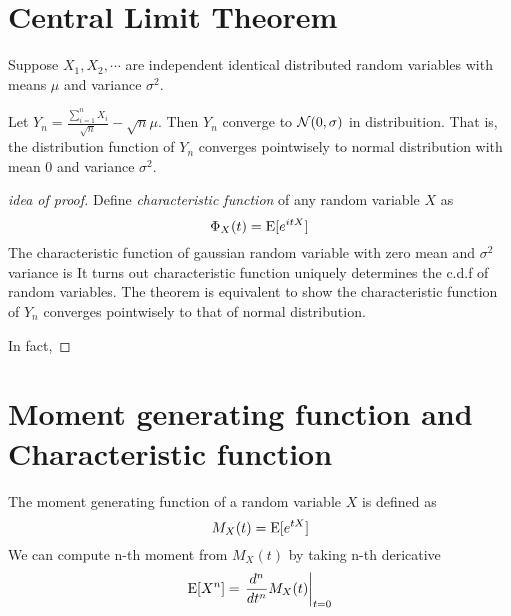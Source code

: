 \section{Central Limit Theorem}
\begin{theorem}
	Suppose $X_1, X_2, \cdots$ are independent identical distributed random variables with means $\mu$ and  variance $\sigma^2$.	
	
	Let $Y_n = \frac{\sum_{i=1}^n X_i}{\sqrt{n}}-\sqrt{n}\mu$. Then $Y_n$ converge to $\mathcal{N}(0, \sigma)$ in distribuition. That is, the distribution function of $Y_n$ converges pointwisely to normal distribution with mean 0 and variance $\sigma^2$. 
\end{theorem}
\begin{proof}[idea of proof]
	Define \textit{characteristic function} of any random variable $X$ as
	$$\Phi_X(t) = \operatorname{E}[e^{itX}]$$
	The characteristic function of gaussian random variable with zero mean and $\sigma^2$ variance is
	It turns out characteristic function uniquely determines the c.d.f of random variables. The theorem is equivalent to show the characteristic function of $Y_n$ converges pointwisely to that of normal distribution.
	
	In fact,
\end{proof}

\section{Moment generating function and Characteristic function}
The moment generating function of a random variable $X$ is defined as
$$M_X(t) = \operatorname{E}[e^{tX}]$$
We can compute n-th moment from $M_X(t)$ by taking n-th dericative
$$\operatorname{E}[X^n] = \left. \frac{d^n}{dt^n} M_X(t) \right|_{t=0}$$

